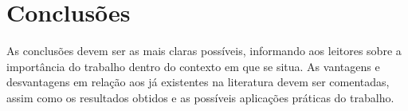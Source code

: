 \section{Conclusões} 


As conclusões devem ser as mais claras possíveis, informando aos leitores sobre a importância do trabalho dentro do contexto em que se situa. As vantagens e desvantagens em relação aos já existentes na literatura devem ser comentadas, assim como os resultados obtidos e as possíveis aplicações práticas do trabalho.





\balance


